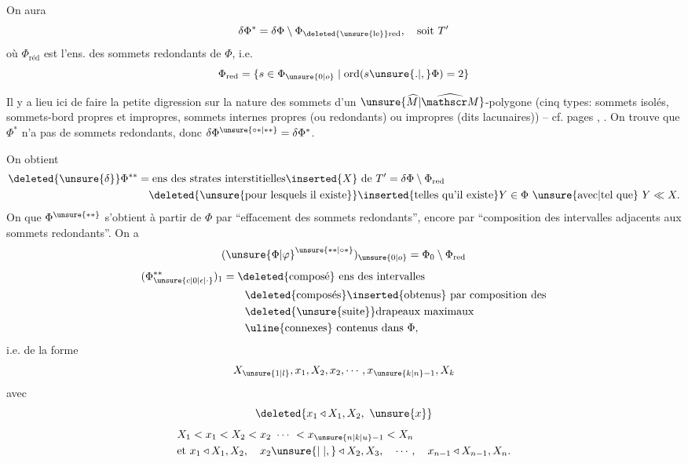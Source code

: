 On aura
\[
\delta\Phi^*=\delta\Phi\setminus\Phi_{\deleted{\unsure{\mathrm{le}}}\mathrm{red}},\quad\text{soit }T'
\]
où $\Phi_{\mathrm{réd}}$ est l'ens. des sommets redondants de $\Phi$, i.e.
\[
\Phi_{\mathrm{red}}=\{s\in\Phi_{\unsure{0|o}}\mid\operatorname{ord}(s\unsure{.|,}\Phi)=2\}
\]


Il y a lieu ici de faire la petite digression sur la nature des sommets d'un $\unsure{\widehat M|\widehat{\mathscr M}}$-polygone (cinq types: sommets isolés, sommets-bord propres et impropres, sommets internes propres (ou redondants) ou impropres (dits lacunaires)) -- cf. pages , . On trouve  que $\Phi^*$ n'a pas de sommets redondants, donc $\delta\Phi^{\unsure{\circ *|**}}=\delta\Phi^*$.

On obtient
\[
\begin{aligned}
\deleted{\unsure{\delta}}\Phi^{**}&=\text{ens des strates interstitielles}\inserted{X}\text{ de }T'=\delta\Phi\setminus\Phi_{\mathrm{red}}\\
&\quad\deleted{\text{\unsure{pour lesquels il existe}}}\inserted{\text{telles qu'il existe}}Y\in\Phi\ \unsure{\text{avec}|\text{tel que}}\ Y\ll X.
\end{aligned}
\]
On  que $\Phi^{\unsure{**}}$ s'obtient à partir de $\Phi$
par ``effacement des sommets redondants'',  encore par ``composition des  intervalles adjacents aux sommets redondants''. On a
\[
({\unsure{\Phi|\varphi}}^{\unsure{**|\circ *}})_{\unsure{0|o}}=\Phi_0\setminus\Phi_{\mathrm{red}}
\]
\[
\begin{aligned}
(\Phi_{\unsure{c|0|\epsilon|\cdot}}^{**})_1&=\deleted{\text{composé}}\text{ ens des intervalles}\\
&\qquad\deleted{\text{composés}}\inserted{\text{obtenus}}\text{ par composition des}\\
&\qquad\deleted{\text{\unsure{suite}}}\text{drapeaux maximaux}\\
&\qquad\uline{\text{connexes}}\text{ contenus dans }\Phi,
\end{aligned}
\]
i.e. de la forme
\[
X_{\unsure{1|l}},x_1,X_2,x_2,\cdots,x_{\unsure{k|n}-1},X_k
\]
avec
\[
\deleted{x_1\triangleleft X_1,X_2,\ \unsure{x}}
\]
\[
\begin{aligned}
&X_1<x_1<X_2<x_2\ \cdots\ <x_{\unsure{n|k|u}-1}<X_n\\
&\text{et }x_1\triangleleft X_1,X_2,\quad x_2\unsure{\mid|,}\triangleleft X_2,X_3,\quad\cdots,\quad x_{n-1}\triangleleft X_{n-1},X_n.
\end{aligned}
\]

